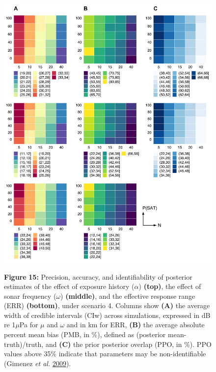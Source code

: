 \documentclass[
]{article}
\begin{document}
\begin{figure}

{\centering \includegraphics[width=0.9\linewidth]{fig/fig_heatplot_S4} 

}

\textbf{Figure }{\textbf{15:} \hypertarget{fig15}{}Precision, accuracy, and identifiability of posterior estimates of the effect of exposure history (\(\alpha\)) \textbf{(top)}, the effect of sonar frequency (\(\omega\)) \textbf{(middle)}, and the effective response range (ERR) \textbf{(bottom)}, under scenario 4. Columns show \textbf{(A)} the average width of credible intervals (CIw) across simulations, expressed in dB re 1\(\mu\)Pa for \(\mu\) and \(\omega\) and in km for ERR, \textbf{(B)} the average absolute percent mean bias (PMB, in \%), defined as (posterior mean-truth)/truth, and \textbf{(C)} the prior posterior overlap (PPO, in \%). PPO values above 35\% indicate that parameters may be non-identifiable (Gimenez \emph{et al.} \protect\hyperlink{ref-Gimenez2009}{2009}).}\label{fig:unnamed-chunk-14}
\end{figure}
\end{document}
